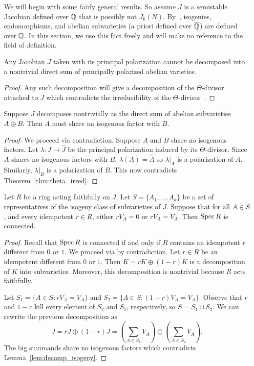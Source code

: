 \documentclass[11pt, proquest]{uwthesis}
\begin{document}
We will begin with some fairly general results. So assume $J$ is a semistable
Jacobian defined over $\mathbb{Q}$ that is possibly not $J_0(N)$. By~\cite[Corollary
1.4]{ribet:endo}, isogenies, endomorphisms, and abelian subvarieties (a priori
defined over $\overline{\mathbb{Q}}$) are defined over $\mathbb{Q}$. In this section, we use this
fact freely and will make no reference to the field of definition.

\begin{theorem}
    \label{thm:theta_irred}
    Any Jacobian $J$ taken with its principal polarization cannot be decomposed
    into a nontrivial direct sum of principally polarized abelian varieties.
\end{theorem}
\begin{proof}
    Any such decomposition will give a decomposition of the $\Theta$-divisor
    attached to $J$ which contradicts the irreducibility of the
    $\Theta$-divisor~\cite[\S 4(a)]{kempf:riemann}.
\end{proof}

\begin{lemma}
    \label{lem:decomp_isogeny}
    Suppose $J$ decomposes nontrivially as the direct sum of abelian subvarieties
    $A\oplus B$. Then $A$ must share an isogenous factor with $B$.
\end{lemma}
\begin{proof}
    We proceed via contradiction. Suppose $A$ and $B$ share no isogenous
    factors. Let $\lambda:J\to \hat{J}$ be the principal polarization induced
    by its $\Theta$-divisor. Since $A$ shares no isogenous factors with $B$,
    $\lambda(A)=\hat{A}$ so $\lambda|_A$ is a polarization of $A$. Similarly,
    $\lambda|_B$ is a polarization of $B$. This now contradicts
    Theorem~\ref{thm:theta_irred}.
\end{proof}

\begin{lemma}
    \label{lem:faithful}
    Let $R$ be a ring acting faithfully on $J$. Let $S=\{A_1,\ldots,A_k\}$ be a
    set of representatives of the isogeny class of subvarieties of $J$.
    Suppose that for all $A\in S$, and every idempotent $r\in R$, either
    $rV_A=0$ or $rV_A=V_A$. Then $\operatorname{Spec} R$ is connected.
\end{lemma}
\begin{proof}
    Recall that $\operatorname{Spec} R$ is connected if and only if $R$ contains an
    idempotent $r$ different from $0$ or $1$. We proceed via by contradiction.
    Let $r\in R$ be an idempotent different from $0$ or $1$. Then $K = rK
    \oplus (1-r) K$ is a decomposition of $K$ into subvarieties. Moreover, this
    decomposition is nontrivial because $R$ acts faithfully.

    Let $S_1=\{A\in S:rV_A=V_A\}$ and $S_2=\{A\in S:(1-r)V_A=V_A\}$. Observe
    that $r$ and $1-r$ kill every element of $S_2$ and $S_1$, respectively, so
    $S=S_1\sqcup S_2$. We can rewrite the previous decomposition as
    \[
        J
        = rJ \oplus (1-r)J
        = \left(\sum_{A\in S_1} V_A \right)
        \oplus \left(\sum_{A\in S_2} V_A \right).
    \]
    The big summands share no isogenous factors which contradicts
    Lemma~\ref{lem:decomp_isogeny}.
\end{proof}
\end{document}
